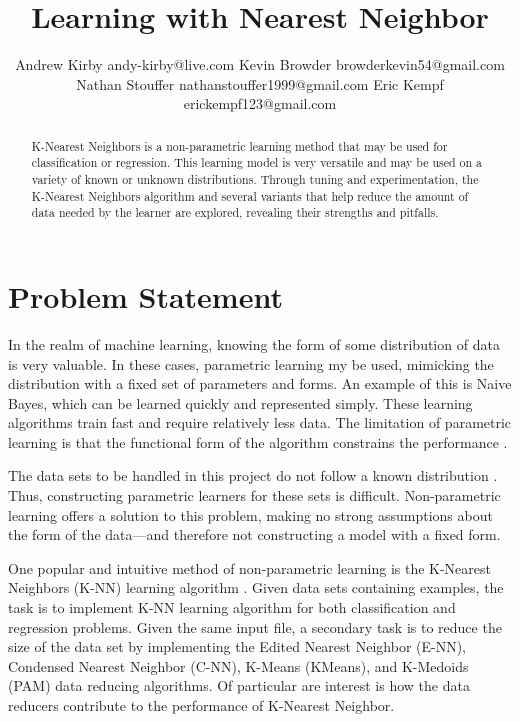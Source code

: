 \documentclass[twoside,11pt]{article}
\begin{document}
\title{Learning with Nearest Neighbor}

\author{\name Andrew Kirby \email andy-kirby@live.com \AND
		\name Kevin Browder \email browderkevin54@gmail.com \AND
		\name Nathan Stouffer \email nathanstouffer1999@gmail.com \AND
		\name Eric Kempf \email erickempf123@gmail.com }

\maketitle

\begin{abstract}
	K-Nearest Neighbors is a non-parametric learning method that may be used for classification or regression. This learning model is very versatile and may be used on a variety of known or unknown distributions. Through tuning and experimentation, the K-Nearest Neighbors algorithm and several variants that help reduce the amount of data needed by the learner are explored, revealing their strengths and pitfalls.

\end{abstract}

\section{Problem Statement}

In the realm of machine learning, knowing the form of some distribution of data is very valuable. In these cases, parametric learning my be used, mimicking the distribution with a fixed set of parameters and forms. An example of this is Naive Bayes, which can be learned quickly and represented simply. These learning algorithms train fast and require relatively less data. The limitation of parametric learning is that the functional form of the algorithm constrains the performance \citep{distance-k-nn}.

The data sets to be handled in this project do not follow a known distribution \citep{datasets}. Thus, constructing parametric learners for these sets is difficult. Non-parametric learning offers a solution to this problem, making no strong assumptions about the form of the data---and therefore not constructing a model with a fixed form.

One popular and intuitive method of non-parametric learning is the K-Nearest Neighbors (K-NN) learning algorithm \citep{NNClassificationOrigPaper}. Given data sets containing examples, the task is to implement K-NN learning algorithm for both classification and regression problems. Given the same input file, a secondary task is to reduce the size of the data set by implementing the Edited Nearest Neighbor (E-NN), Condensed Nearest Neighbor (C-NN), K-Means (KMeans), and K-Medoids (PAM) data reducing algorithms. Of particular are interest is how the data reducers contribute to the performance of K-Nearest Neighbor.
\end{document}
